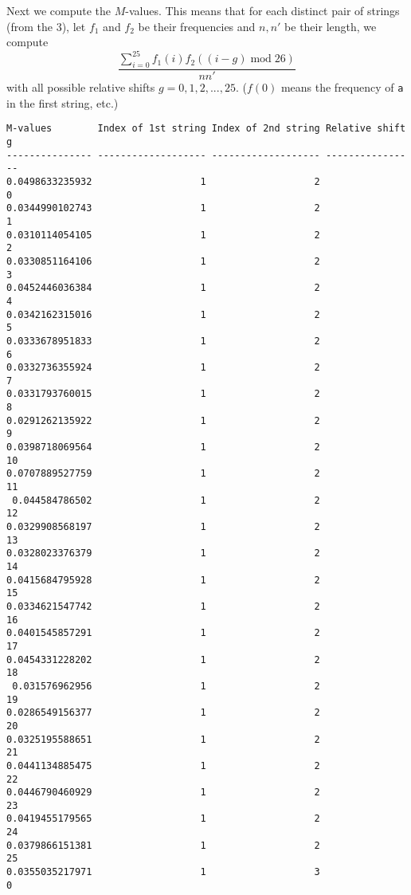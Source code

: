 Next we compute the $M$-values. 
This means that for each distinct pair of strings
(from the 3), let $f_1$ and $f_2$ be their frequencies
and $n,n'$ be their length, we compute
\[
\frac{\sum_{i=0}^{25} f_1(i)f_2((i - g) \operatorname{mod} 26) }
     {nn'}
\]
with all possible relative shifts $g = 0, 1, 2, ..., 25$.
($f(0)$ means the frequency of \verb!a! in the first string, etc.)

\begin{Verbatim}[fontsize=\scriptsize,frame=single]
M-values        Index of 1st string Index of 2nd string Relative shift g
--------------- ------------------- ------------------- ----------------
0.0498633235932                   1                   2                0
0.0344990102743                   1                   2                1
0.0310114054105                   1                   2                2
0.0330851164106                   1                   2                3
0.0452446036384                   1                   2                4
0.0342162315016                   1                   2                5
0.0333678951833                   1                   2                6
0.0332736355924                   1                   2                7
0.0331793760015                   1                   2                8
0.0291262135922                   1                   2                9
0.0398718069564                   1                   2               10
0.0707889527759                   1                   2               11
 0.044584786502                   1                   2               12
0.0329908568197                   1                   2               13
0.0328023376379                   1                   2               14
0.0415684795928                   1                   2               15
0.0334621547742                   1                   2               16
0.0401545857291                   1                   2               17
0.0454331228202                   1                   2               18
 0.031576962956                   1                   2               19
0.0286549156377                   1                   2               20
0.0325195588651                   1                   2               21
0.0441134885475                   1                   2               22
0.0446790460929                   1                   2               23
0.0419455179565                   1                   2               24
0.0379866151381                   1                   2               25
0.0355035217971                   1                   3                0

\end{Verbatim}
